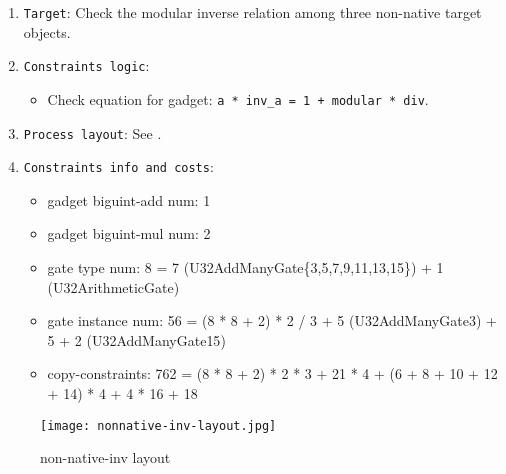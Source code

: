 
\begin{enumerate}
    \item \verb|Target|: Check the modular inverse relation among three non-native target objects.
    \item \verb|Constraints logic|:
    \begin{itemize}
        \item Check equation for gadget: \verb|a * inv_a = 1 + modular * div|.
    \end{itemize}
    \item \verb|Process layout|: See .
    \item \verb|Constraints info and costs|:
    \begin{itemize}
        \item gadget biguint-add num: 1
        \item gadget biguint-mul num: 2
        \item gate type num: 8 = 7 (U32AddManyGate\{3,5,7,9,11,13,15\}) + 1 (U32ArithmeticGate)
        \item gate instance num: 56 = (8 * 8 + 2) * 2 / 3 + 5 (U32AddManyGate{3}) + 5 + 2 (U32AddManyGate{15})
        \item copy-constraints: 762 = (8 * 8 + 2) * 2 * 3 + 21 * 4 + (6 + 8 + 10 + 12 + 14) * 4 + 4 * 16 + 18
    \end{itemize}
\end{enumerate}

\begin{figure}[!ht]
    \centering
    \texttt{[image: nonnative-inv-layout.jpg]}
    \caption{non-native-inv layout}
    \label{fig:non-native-inv-layout}
\end{figure}
